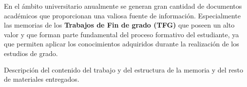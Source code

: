 
En el ámbito universitario anualmente se generan gran cantidad de documentos académicos que proporcionan una valiosa fuente de información. Especialmente las memorias de los \textbf{Trabajos de Fin de grado (TFG)} que poseen un alto valor y que forman parte fundamental del proceso formativo del estudiante, ya que permiten aplicar los conocimientos adquiridos durante la realización de los estudios de grado.





Descripción del contenido del trabajo y del estructura de la memoria y del resto de materiales entregados.
